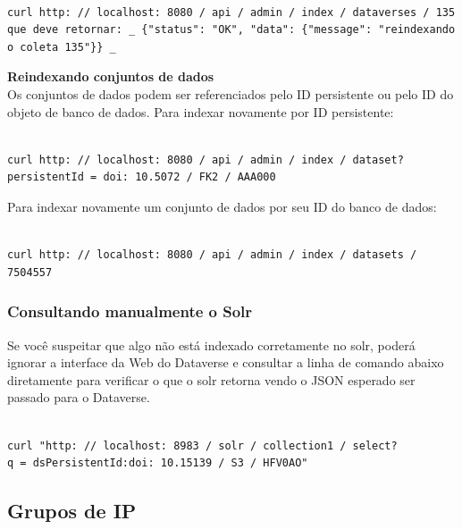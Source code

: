 \documentclass[12pt,hidelinks]{article}
\begin{document}
\begin{verbatim}

curl http: // localhost: 8080 / api / admin / index / dataverses / 135
que deve retornar: _ {"status": "OK", "data": {"message": "reindexando
o coleta 135"}} _

\end{verbatim}

\textbf{Reindexando conjuntos de dados}\\

Os conjuntos de dados podem ser referenciados pelo ID persistente ou pelo ID do objeto de banco de dados. Para indexar novamente por ID persistente:

\begin{verbatim}

curl http: // localhost: 8080 / api / admin / index / dataset?
persistentId = doi: 10.5072 / FK2 / AAA000

\end{verbatim}

Para indexar novamente um conjunto de dados por seu ID do banco de dados:

\begin{verbatim}

curl http: // localhost: 8080 / api / admin / index / datasets / 7504557

\end{verbatim}

\subsubsection{Consultando manualmente o Solr}

\qquad Se você suspeitar que algo não está indexado corretamente no solr, poderá ignorar a interface da Web do Dataverse e consultar a linha de comando abaixo diretamente para verificar o que o solr retorna vendo o JSON esperado ser passado para o Dataverse.

\begin{verbatim}

curl "http: // localhost: 8983 / solr / collection1 / select? 
q = dsPersistentId:doi: 10.15139 / S3 / HFV0AO"

\end{verbatim}

\subsection{Grupos de IP}
\end{document}
